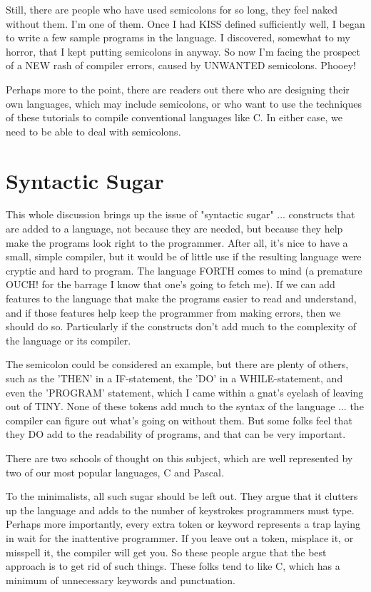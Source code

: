 \documentclass[float=false, crop=false]{standalone}
\begin{document}
Still, there are people who have used semicolons for so long, they feel naked
without them. I'm one of them. Once I had KISS defined sufficiently well, I
began to write a few sample programs in the language. I discovered, somewhat to
my horror, that I kept putting semicolons in anyway. So now I'm facing the
prospect of a NEW rash of compiler errors, caused by UNWANTED semicolons.
Phooey!

Perhaps more to the point, there are readers out there who are designing their
own languages, which may include semicolons, or who want to use the techniques
of these tutorials to compile conventional languages like C. In either case, we
need to be able to deal with semicolons.


\section{Syntactic Sugar}

This whole discussion brings up the issue of "syntactic sugar" ... constructs
that are added to a language, not because they are needed, but because they help
make the programs look right to the programmer. After all, it's nice to have a
small, simple compiler, but it would be of little use if the resulting language
were cryptic and hard to program. The language FORTH comes to mind (a premature
OUCH! for the barrage I know that one's going to fetch me). If we can add
features to the language that make the programs easier to read and understand,
and if those features help keep the programmer from making errors, then we
should do so. Particularly if the constructs don't add much to the complexity of
the language or its compiler.

The semicolon could be considered an example, but there are plenty of others,
such as the 'THEN' in a IF-statement, the 'DO' in a WHILE-statement, and even
the 'PROGRAM' statement, which I came within a gnat's eyelash of leaving out of
TINY. None of these tokens add much to the syntax of the language ... the
compiler can figure out what's going on without them. But some folks feel that
they DO add to the readability of programs, and that can be very important.

There are two schools of thought on this subject, which are well represented by
two of our most popular languages, C and Pascal.

To the minimalists, all such sugar should be left out. They argue that it
clutters up the language and adds to the number of keystrokes programmers must
type. Perhaps more importantly, every extra token or keyword represents a trap
laying in wait for the inattentive programmer. If you leave out a token,
misplace it, or misspell it, the compiler will get you. So these people argue
that the best approach is to get rid of such things. These folks tend to like C,
which has a minimum of unnecessary keywords and punctuation.
\end{document}
